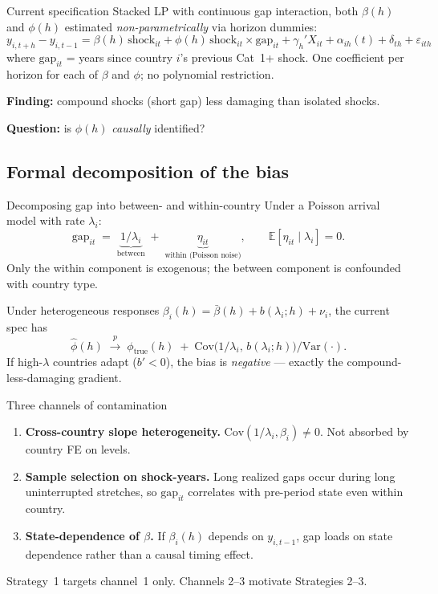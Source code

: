 \documentclass[aspectratio=169]{beamer}
\begin{document}
\begin{frame}{Current specification}
Stacked LP with continuous gap interaction, both $\beta(h)$ and $\phi(h)$ estimated \emph{non-parametrically} via horizon dummies:
\[
  y_{i,t+h} - y_{i,t-1}
  = \beta(h)\,\mathrm{shock}_{it}
  + \phi(h)\,\mathrm{shock}_{it}\times\mathrm{gap}_{it}
  + \gamma_h'X_{it} + \alpha_{ih}(t) + \delta_{th} + \varepsilon_{ith}
\]
where $\mathrm{gap}_{it}$ = years since country $i$'s previous Cat~1+ shock. One coefficient per horizon for each of $\beta$ and $\phi$; no polynomial restriction.

\medskip
\textbf{Finding:} compound shocks (short gap) less damaging than isolated shocks.

\medskip
\textbf{Question:} is $\phi(h)$ \emph{causally} identified?
\end{frame}

\subsection{Formal decomposition of the bias}
\begin{frame}\subsectionpage\end{frame}

\begin{frame}{Decomposing gap into between- and within-country}
Under a Poisson arrival model with rate $\lambda_i$:
\[
  \mathrm{gap}_{it} \;=\; \underbrace{1/\lambda_i}_{\text{between}} \;+\; \underbrace{\eta_{it}}_{\text{within (Poisson noise)}},
  \qquad \mathbb{E}[\eta_{it}\mid\lambda_i]=0.
\]
Only the within component is exogenous; the between component is confounded with country type.

\medskip
Under heterogeneous responses $\beta_i(h)=\bar\beta(h)+b(\lambda_i;h)+\nu_i$, the current spec has
\[
  \hat\phi(h)\;\xrightarrow{p}\;\phi_{\text{true}}(h)\;+\;\text{Cov}\!\big(1/\lambda_i,\,b(\lambda_i;h)\big)/\text{Var}(\cdot).
\]
If high-$\lambda$ countries adapt ($b'<0$), the bias is \emph{negative} --- exactly the compound-less-damaging gradient.
\end{frame}

\begin{frame}{Three channels of contamination}
\begin{enumerate}
  \item \textbf{Cross-country slope heterogeneity.} $\text{Cov}(1/\lambda_i,\beta_i)\neq 0$. Not absorbed by country FE on levels.

  \medskip
  \item \textbf{Sample selection on shock-years.} Long realized gaps occur during long uninterrupted stretches, so $\mathrm{gap}_{it}$ correlates with pre-period state even within country.

  \medskip
  \item \textbf{State-dependence of $\beta$.} If $\beta_i(h)$ depends on $y_{i,t-1}$, gap loads on state dependence rather than a causal timing effect.
\end{enumerate}

\medskip
Strategy~1 targets channel~1 only. Channels 2--3 motivate Strategies 2--3.
\end{frame}
\end{document}
